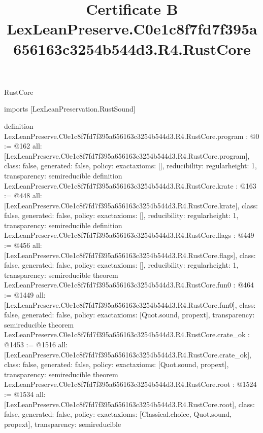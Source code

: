 \begin{lexlean}{RustCore}
\title{Certificate B LexLeanPreserve.C0e1c8f7fd7f395a656163c3254b544d3.R4.RustCore}
\begin{coremodule}
imports [LexLeanPreservation.RustSound]

definition LexLeanPreserve.C0e1c8f7fd7f395a656163c3254b544d3.R4.RustCore.program : @0 := @162 {
  all: [LexLeanPreserve.C0e1c8f7fd7f395a656163c3254b544d3.R4.RustCore.program],
  class: false,
  generated: false,
  policy: exact{axioms: []},
  reducibility: regular{height: 1},
  transparency: semireducible
}
definition LexLeanPreserve.C0e1c8f7fd7f395a656163c3254b544d3.R4.RustCore.krate : @163 := @448 {
  all: [LexLeanPreserve.C0e1c8f7fd7f395a656163c3254b544d3.R4.RustCore.krate],
  class: false,
  generated: false,
  policy: exact{axioms: []},
  reducibility: regular{height: 1},
  transparency: semireducible
}
definition LexLeanPreserve.C0e1c8f7fd7f395a656163c3254b544d3.R4.RustCore.flags : @449 := @456 {
  all: [LexLeanPreserve.C0e1c8f7fd7f395a656163c3254b544d3.R4.RustCore.flags],
  class: false,
  generated: false,
  policy: exact{axioms: []},
  reducibility: regular{height: 1},
  transparency: semireducible
}
theorem LexLeanPreserve.C0e1c8f7fd7f395a656163c3254b544d3.R4.RustCore.fun0 : @464 := @1449 {
  all: [LexLeanPreserve.C0e1c8f7fd7f395a656163c3254b544d3.R4.RustCore.fun0],
  class: false,
  generated: false,
  policy: exact{axioms: [Quot.sound, propext]},
  transparency: semireducible
}
theorem LexLeanPreserve.C0e1c8f7fd7f395a656163c3254b544d3.R4.RustCore.crate_ok : @1453 := @1516 {
  all: [LexLeanPreserve.C0e1c8f7fd7f395a656163c3254b544d3.R4.RustCore.crate_ok],
  class: false,
  generated: false,
  policy: exact{axioms: [Quot.sound, propext]},
  transparency: semireducible
}
theorem LexLeanPreserve.C0e1c8f7fd7f395a656163c3254b544d3.R4.RustCore.root : @1524 := @1534 {
  all: [LexLeanPreserve.C0e1c8f7fd7f395a656163c3254b544d3.R4.RustCore.root],
  class: false,
  generated: false,
  policy: exact{axioms: [Classical.choice, Quot.sound, propext]},
  transparency: semireducible
}


\end{coremodule}
\end{lexlean}
